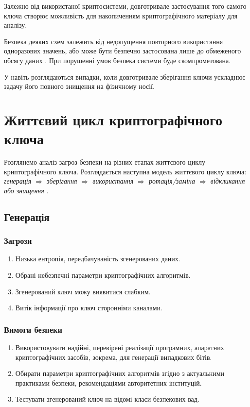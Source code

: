 \documentclass{kpi-lab}
\begin{document}
Залежно від використаної криптосистеми, довготривале
застосування того самого ключа створює можливість для
накопиченням криптографічного матеріалу для аналізу.

Безпека деяких схем залежить від недопущення повторного
використання одноразових значень, або може бути безпечно
застосована лише до обмеженого обсягу даних \cite{Barker2020a}.
При порушенні умов безпека системи буде скомпрометована.

У \cite{DiCrescenzo1999} навіть розглядаються випадки, коли
довготривале зберігання ключи ускладнює задачу його повного
знищення на фізичному носії.

\chapter{Життєвий цикл криптографічного ключа}

Розглянемо аналіз загроз безпеки на різних етапах життєвого циклу
криптографічного ключа. Розглядається наступна модель
життєвого циклу ключа:
{\it
  генерація
  $\Longrightarrow$ зберігання
  $\Longrightarrow$ використання
  $\Longrightarrow$ ротація/заміна
  $\Longrightarrow$ відкликання або знищення
}.

\section{Генерація}
\subsection{Загрози}
\begin{enumerate}
  \item
    Низька ентропія, передбачуваність згенерованих даних.
  \item
    Обрані небезпечні параметри криптографічних алгоритмів.
  \item
    Згенерований ключ можу виявитися слабким.
  \item
    Витік інформації про ключ сторонніми каналами.
\end{enumerate}
\subsection{Вимоги безпеки}
\begin{enumerate}
  \item
    Використовувати надійні, перевірені реалізації
    програмних, апаратних криптографічних засобів, зокрема,
    для генерації випадкових бітів.
  \item
    Обирати параметри криптографічних алгоритмів згідно
    з актуальними  практиками безпеки, рекомендаціями
    авторитетних інституцій.
  \item
    Тестувати згенерований ключ на відомі класи безпекових вад.
\end{enumerate}
\end{document}
